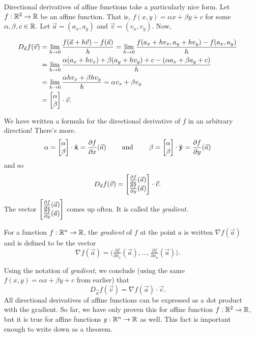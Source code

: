 Directional derivatives of affine functions take a particularly nice form.
Let $f:\mathbb{R}^2\to\mathbb{R}$ be an affine function.
That is, $f(x,y)=\alpha x+\beta y+c$ for some $\alpha,\beta,c\in\mathbb{R}$. 
Let $\vec a=(a_x,a_y)$ and $\vec v=(v_x,v_y)$.  Now,

\begin{align*}
	D_{\vec a}f(\vec v) &= \lim_{h\to0}\frac{f(\vec a+h\vec v)-f(\vec a)}{h}
	=\lim_{h\to0}\frac{f(a_x+hv_x, a_y+hv_y)-f(a_x,a_y)}{h}\\
	&=\lim_{h\to0}\frac{\alpha(a_x+hv_x)+\beta( a_y+hv_y)+c-(\alpha a_x+\beta a_y+c)}{h}\\
	&=\lim_{h\to0}\frac{\alpha hv_x+\beta hv_y}{h} = \alpha v_x+\beta v_y\\
	&=\mat{\alpha\\\beta}\cdot \vec v.
\end{align*}

We have written a formula for the directional derivative of $f$ in an arbitrary direction!  There's more.
\[
	\alpha = \mat{\alpha\\\beta}\cdot \xhat = \frac{\partial f}{\partial x}(\vec a)
	\qquad\text{ and }\qquad
	\beta = \mat{\alpha\\\beta}\cdot \yhat = \frac{\partial f}{\partial y}(\vec a)
\]
and so
\[
	D_{\vec a}f(\vec v) = \mat{\tfrac{\partial f}{\partial x}(\vec a)\\\tfrac{\partial f}{\partial y}(\vec a)}
	\cdot \vec v.
\]
The vector $\mat{\tfrac{\partial f}{\partial x}(\vec a)\\\tfrac{\partial f}{\partial y}(\vec a)}$ comes up often.
It is called the \emph{gradient}.

\begin{definition}[Gradient]
	For a function $f:\mathbb{R}^n\to\mathbb{R}$, the \emph{gradient} of $f$ at the point $a$ is
	written $\nabla f(\vec a)$ and is defined to be the vector
	\[
		\nabla f(\vec a) = \Big(\tfrac{\partial f}{\partial x_1}(\vec a),
		\ldots, \tfrac{\partial f}{\partial x_n}(\vec a) \Big).
	\]
\end{definition}

Using the notation of \emph{gradient}, 
we conclude (using the same $f(x,y)=\alpha x+\beta y+c$ from earlier) that
\begin{equation}
	\label{EQDIRDERIVGRAD}
	D_{\vec a}f(\vec v) = \nabla f(\vec a)\cdot \vec v.
\end{equation}
All directional derivatives of affine functions can be expressed as a dot product with
the gradient.  So far, we have only proven this for
affine function $f:\mathbb{R}^2\to\mathbb{R}$, but it is true for affine functions
$g:\mathbb{R}^n\to\mathbb{R}$ as well.  This fact is important enough to write down
as a theorem.


